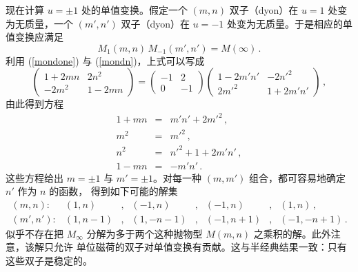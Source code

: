 
现在计算 $u=\pm 1$ 处的单值变换。假定一个 $(m,n)$ 双子（dyon）在 $u=1$ 处变为无质量，一个
$(m',n')$ 双子（dyon）在 $u=-1$ 处变为无质量。于是相应的单值变换应满足
\begin{equation}
M_1(m,n)\,M_{-1}(m',n') = M (\infty)\,.
\label{mondeq}
\end{equation}
利用 (\ref{mondone}) 与 (\ref{mondn})，上式可以写成
$$
\left ( \begin{array}{cccc} 1 + 2mn & 2n^{2} \\ -2m^{2} & 1-2mn
\end{array} \right ) =
\left( \begin{array}{cccc} -1 & 2 \\ 0 & -1 \end{array} \right )
\left ( \begin{array}{cccc} 1-2m'n' & -2n'^{2} \\
2m'^{2} & 1 + 2m'n' \end{array} \right )\,,
$$
由此得到方程
$$
\begin{array}{rcl}
1 + mn &=& m'n' + 2m'^{2} \,,\\
m^{2} &=& m'^{2} \,,\\
n^{2} &=& n'^{2} + 1 + 2m'n'\,, \\
1 - mn &=& -m'n'\,.
\end{array}
$$
这些方程给出 $m=\pm 1$ 与 $m'=\pm 1$。对每一种 $(m,m')$ 组合，都可容易地确定 $n'$ 作为 $n$ 的函数，
得到如下可能的解集
$$
\begin{array}{cccccccc}
(m,n): &(1,n)&,&(-1, n)&,&(-1, n)&,&(1, n)\,,\\
(m',n'): &(1, n-1)&,&(1, -n-1)&,&(-1, n+1)&,&(-1, -n+1)\,. 
\end{array}
$$
似乎不存在把 $M_{\infty}$ 分解为多于两个这种抛物型 $M(m,n)$ 之乘积的解。此外注意，该解只允许
单位磁荷的双子对单值变换有贡献。这与半经典结果一致：只有这些双子是稳定的。


